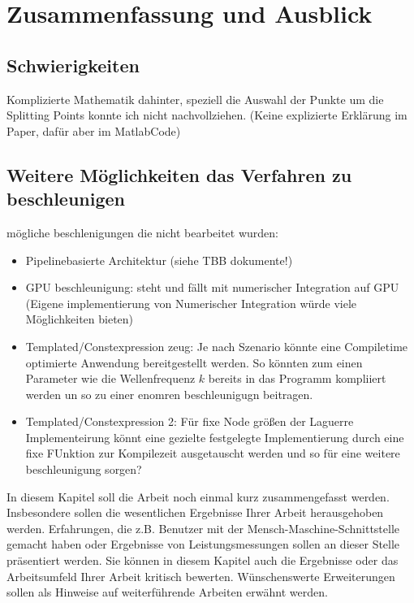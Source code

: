 \chapter{Zusammenfassung und Ausblick}

\section{Schwierigkeiten}

Komplizierte Mathematik dahinter, 
speziell die Auswahl der Punkte um die Splitting Points konnte ich nicht nachvollziehen. (Keine explizierte Erklärung im Paper, dafür aber im MatlabCode)


\section{Weitere Möglichkeiten das Verfahren zu beschleunigen}
mögliche beschlenigungen die nicht bearbeitet wurden:
\begin{itemize}
    \item Pipelinebasierte Architektur (siehe TBB dokumente!)
    \item GPU beschleunigung: steht und fällt mit numerischer Integration auf GPU (Eigene implementierung von Numerischer Integration würde viele Möglichkeiten bieten)
    \item Templated/Constexpression zeug: Je nach Szenario könnte eine Compiletime optimierte Anwendung bereitgestellt werden. So könnten zum einen Parameter wie die Wellenfrequenz $k$ bereits in das Programm kompliiert werden un so zu einer enomren beschleunigugn beitragen.
    \item Templated/Constexpression 2: Für fixe Node größen der Laguerre Implementeirung könnt eine gezielte festgelegte Implementierung durch eine fixe FUnktion zur Kompilezeit ausgetauscht werden und so für eine weitere beschleunigung sorgen?
\end{itemize}

In diesem Kapitel soll die Arbeit noch einmal kurz zusammengefasst werden. Insbesondere sollen die wesentlichen Ergebnisse Ihrer Arbeit herausgehoben werden. Erfahrungen, die z.B. Benutzer mit der Mensch-Maschine-Schnittstelle gemacht haben oder Ergebnisse von Leistungsmessungen sollen an dieser Stelle präsentiert werden. Sie können in diesem Kapitel auch die Ergebnisse oder das Arbeitsumfeld Ihrer Arbeit kritisch bewerten. Wünschenswerte Erweiterungen sollen als Hinweise auf weiterführende Arbeiten erwähnt werden.
